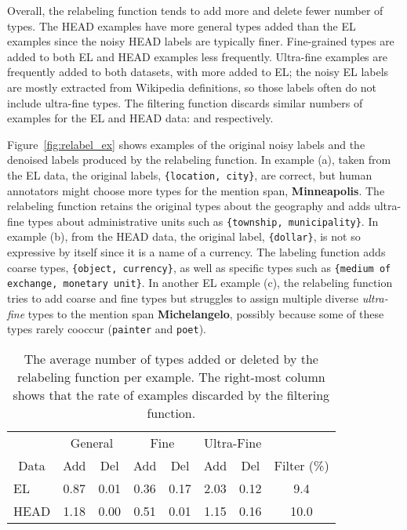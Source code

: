 \documentclass[11pt,a4paper]{article}
\begin{document}
Overall, the relabeling function tends to add more and delete fewer number of types. The HEAD examples have more general types added than the EL examples since the noisy HEAD labels are typically finer. Fine-grained types are added to both EL and HEAD examples less frequently. Ultra-fine examples are frequently added to both datasets, with more added to EL; the noisy EL labels are mostly extracted from Wikipedia definitions, so those labels often do not include ultra-fine types. The filtering function discards similar numbers of examples for the EL and HEAD data:  and  respectively.

Figure~\ref{fig:relabel_ex} shows examples of the original noisy labels and the denoised labels produced by the relabeling function. In example (a), taken from the EL data, the original labels, {\tt \{location, city\}}, are correct, but human annotators might choose more types for the mention span, {\bf Minneapolis}. The relabeling function retains the original types about the geography and adds ultra-fine types about administrative units such as {\tt \{township, municipality\}}.
In example (b), from the HEAD data, the original label, {\tt \{dollar\}}, is not so expressive by itself since it is a name of a currency. The labeling function adds coarse types, {\tt \{object, currency\}}, as well as specific types such as {\tt \{medium of exchange, monetary unit\}}. In another EL example (c), the relabeling function tries to add coarse and fine types but struggles to assign multiple diverse {\it ultra-fine} types to the mention span {\bf Michelangelo}, possibly because some of these types rarely cooccur (\texttt{painter} and \texttt{poet}).


\renewcommand{\arraystretch}{1}
\begin{table}[t]
	\centering
	\small
	\setlength{\tabcolsep}{4pt}
\begin{tabular}{l c c c c c c c}
\toprule
		\multicolumn{1}{c}{} & \multicolumn{2}{c}{General} & \multicolumn{2}{c}{Fine} & \multicolumn{2}{c}{Ultra-Fine} \\
	    \cmidrule(r){2-3}  \cmidrule(r){4-5} \cmidrule(r){6-7}
		\multicolumn{1}{c}{Data}
		 & Add & Del & Add & Del  & Add & Del & Filter (\%) \\
		\midrule
EL & 0.87 & 0.01 & 0.36 & 0.17 & 2.03 & 0.12 & 9.4\\
		HEAD  & 1.18 & 0.00 & 0.51 & 0.01 & 1.15 & 0.16 & 10.0 \\
		\bottomrule 
	\end{tabular}
\caption{The average number of types added or deleted by the relabeling function per example. The right-most column shows that the rate of examples discarded by the filtering function.} \label{tab:relabel}
\end{table}
\end{document}
